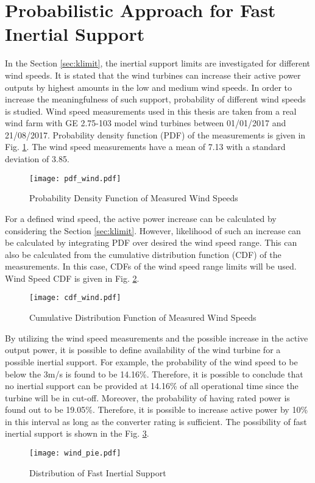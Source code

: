 \section{Probabilistic Approach for Fast Inertial Support}
In the Section \ref{sec:klimit}, the inertial support limits are investigated for different wind speeds. It is stated that the wind turbines can increase their active power outputs by highest amounts in the low and medium wind speeds. In order to increase the meaningfulness of such support, probability of different wind speeds is studied. Wind speed measurements used in this thesis are taken from a real wind farm with GE 2.75-103 model wind turbines between 01/01/2017 and 21/08/2017. Probability density function (PDF) of the measurements is given in Fig. \ref{windpdf}. The wind speed measurements have a mean of 7.13 with a standard deviation of 3.85.\par
\begin{figure}[h!]
	\centering
	\texttt{[image: pdf\_wind.pdf]}
	\caption{Probability Density Function of Measured Wind Speeds}
	\label{windpdf}
\end{figure}
For a defined wind speed, the active power increase can be calculated by considering the Section \ref{sec:klimit}. However, likelihood of such an increase can be calculated by integrating PDF over desired the wind speed range. This can also be calculated from the cumulative distribution function (CDF) of the measurements. In this case, CDFs of the wind speed range limits will be used. Wind Speed CDF is given in Fig. \ref{windcdf}. \par
\begin{figure}[h!]
	\centering
	\texttt{[image: cdf\_wind.pdf]}
	\caption{Cumulative Distribution Function of Measured Wind Speeds}
	\label{windcdf}
\end{figure}
By utilizing the wind speed measurements and the possible increase in the active output power, it is possible to define availability of the wind turbine for a possible inertial support. For example, the probability of the wind speed to be below the 3m/s is found to be 14.16\%. Therefore, it is possible to conclude that no inertial support can be provided at 14.16\% of all operational time since the turbine will be in cut-off. Moreover, the probability of having rated power is found out to be 19.05\%. Therefore, it is possible to increase active power by 10\% in this interval as long as the converter rating is sufficient. The possibility of fast inertial support is shown in the Fig. \ref{wind_pie}.
\begin{figure}[h!]
	\centering
	\texttt{[image: wind\_pie.pdf]}
	\caption{Distribution of Fast Inertial Support}
	\label{wind_pie}
\end{figure}
